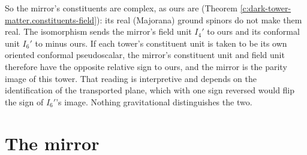 \documentclass[11pt]{article}
\theoremstyle{definition}
\theoremstyle{plain}
\begin{document}
\label{c:note.dark-tower-matter.setting-mirror}
So the mirror's constituents are complex, as ours are (Theorem \ref{c:dark-tower-matter.constituents-field}): its real (Majorana) ground spinors do not make them real. The isomorphism sends the mirror's field unit $I_{4}'$ to ours and its conformal unit $I_{6}'$ to minus ours. If each tower's constituent unit is taken to be its own oriented conformal pseudoscalar, the mirror's constituent unit and field unit therefore have the opposite relative sign to ours, and the mirror is the parity image of this tower. That reading is interpretive and depends on the identification of the transported plane, which with one sign reversed would flip the sign of $I_{6}'$'s image. Nothing gravitational distinguishes the two.

\section{The mirror}
\end{document}
